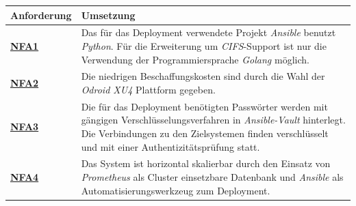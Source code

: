 \documentclass[titlepage]{report}
\begin{document}
\tabulinesep=1.2mm
\begin{center}
    \begin{tabu}{X[-1] X}
\toprule
\textbf{Anforderung} & \textbf{Umsetzung}  \\
\midrule
        \hyperref[table:NFA1]{\textbf{NFA1}} & Das für das Deployment verwendete Projekt \emph{Ansible} benutzt \emph{Python}. Für die Erweiterung um \emph{CIFS}\hyp{}Support ist nur die Verwendung der Programmiersprache \emph{Golang} möglich. \\
        \hyperref[table:NFA2]{\textbf{NFA2}} & Die niedrigen Beschaffungskosten sind durch die Wahl der \emph{Odroid XU4} Plattform gegeben. \\
        \hyperref[table:NFA3]{\textbf{NFA3}} & Die für das Deployment benötigten Passwörter werden mit gängigen Verschlüsselungsverfahren in \emph{Ansible-Vault}  hinterlegt. Die Verbindungen zu den Zielsystemen finden verschlüsselt und mit einer Authentizitätsprüfung statt. \\
        \hyperref[table:NFA4]{\textbf{NFA4}} & Das System ist horizontal skalierbar durch den Einsatz von \emph{Prometheus} als Cluster einsetzbare Datenbank und \emph{Ansible} als Automatisierungswerkzeug zum Deployment. \\
\bottomrule
    \end{tabu}
    \label{table:mapping2}
\end{center}
\end{document}
